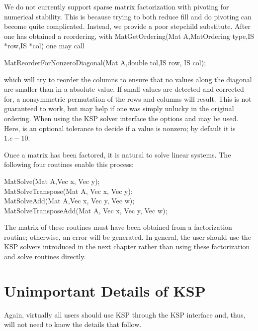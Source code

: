 {{{We do not currently support sparse matrix factorization with pivoting
for numerical stability. This is because trying to both reduce fill
and do pivoting can become quite complicated. Instead, we provide a 
poor stepchild substitute. After one has obtained a reordering, with
MatGetOrdering(Mat A,MatOrdering type,IS *row,IS *col) one
may call
\begin{tabbing}
  MatReorderForNonzeroDiagonal(Mat A,double tol,IS row, IS col);
\end{tabbing}
which will try to reorder the columns to ensure that no values along 
the diagonal are smaller than  in a absolute value. If small 
values are detected and corrected for, a nonsymmetric
permutation of the rows and columns will result. This is not guaranteed to work, 
but may help if one was simply unlucky in the original ordering.
 When using the KSP solver interface
the options  
and 
 may be used.  Here, 
is an optional tolerance to decide if a value is nonzero; by default it
is $ 1.e-10.$ 

Once a matrix has been factored, it is natural to solve linear systems.
The following four routines enable this process:  
\begin{tabbing}
  MatSolve(Mat A,Vec x, Vec y);\\
  MatSolveTranspose(Mat A, Vec x, Vec y);\\
  MatSolveAdd(Mat A,Vec x, Vec y, Vec w);\\
  MatSolveTransposeAdd(Mat A, Vec x, Vec y, Vec w);
\end{tabbing}
The  
matrix 
 of these routines must have been obtained from a 
factorization routine; otherwise, an error will be generated.
In general, the user should use the KSP solvers introduced in the 
next chapter rather than using these factorization and solve routines
directly.

\section{Unimportant Details of KSP}

Again, virtually all users should use KSP through the KSP interface
and, thus, will not need to know the details that follow. 

}}}
